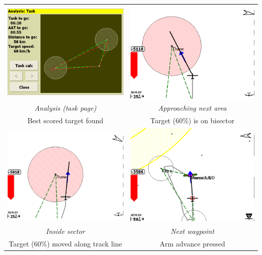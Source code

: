 \documentclass[a4paper,12pt]{refrep}
\begin{document}
\begin{maxipage}
\begin{center}
\begin{longtable}{|c|c|}
\toprule
\includegraphics[angle=0,width=0.45\linewidth,keepaspectratio='true']{figures/faat07.png} & 
\includegraphics[angle=0,width=0.45\linewidth,keepaspectratio='true']{figures/faat08.png} \\
{\em Analysis (task page)} & {\em Approaching next area} \\
Best scored target found & Target (60\%) is on bisector \\

\midrule
\includegraphics[angle=0,width=0.45\linewidth,keepaspectratio='true']{figures/faat09.png} & 
\includegraphics[angle=0,width=0.45\linewidth,keepaspectratio='true']{figures/faat11.png} \\
{\em Inside sector} & {\em Next waypoint} \\
Target (60\%) moved along track line & Arm advance pressed \\


\end{longtable}
\end{center}
\end{maxipage}
\end{document}
